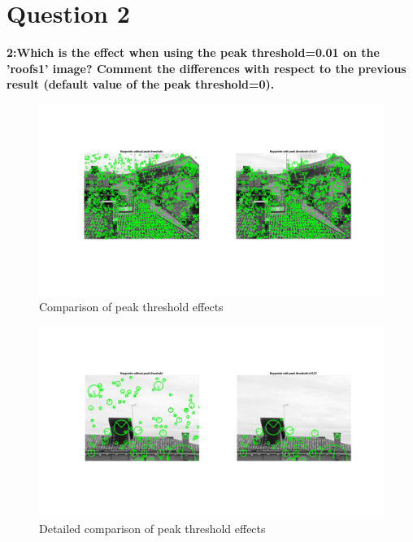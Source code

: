 \section{Question 2}

{\bfseries 2:Which is the effect when using the peak threshold=0.01 on the
'roofs1' image? Comment the differences with respect to the previous result
(default value of the peak threshold=0).}

\begin{figure}[!hbt]
  \includegraphics[width=\textwidth]{img/diff_peak_thresh}
  \caption{Comparison of peak threshold effects}
  \label{fig:diff_peak_thresh}
\end{figure}

\begin{figure}[!hbt]
  \includegraphics[width=\textwidth]{img/diff_peak_thresh2}
  \caption{Detailed comparison of peak threshold effects}
  \label{fig:diff_peak_thresh2}
\end{figure}